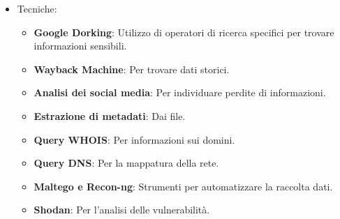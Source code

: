 \documentclass[12pt]{article}
\begin{document}
\begin{enumerate}
\begin{enumerate}
\begin{itemize}
            \item Tecniche:
            \begin{itemize}
                \item \textbf{Google Dorking}: Utilizzo di operatori di ricerca 
                specifici per trovare informazioni sensibili.
                \item \textbf{Wayback Machine}: Per trovare dati storici.
                \item \textbf{Analisi dei social media}: Per individuare perdite 
                di informazioni.
                \item \textbf{Estrazione di metadati}: Dai file.
                \item \textbf{Query WHOIS}: Per informazioni sui domini.
                \item \textbf{Query DNS}: Per la mappatura della rete.
                \item \textbf{Maltego e Recon-ng}: Strumenti per automatizzare 
                la raccolta dati.
                \item \textbf{Shodan}: Per l'analisi delle vulnerabilit\`{a}.
            \end{itemize} 
        \end{itemize}
        

\end{enumerate}
\end{enumerate}
\end{document}
